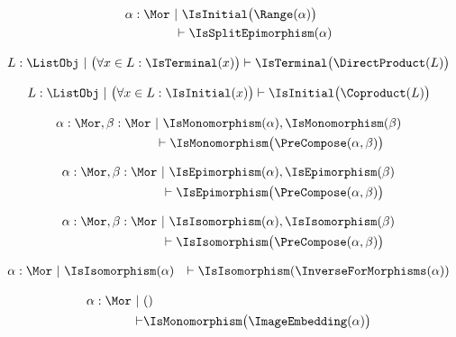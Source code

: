 \begin{sequent}\label{sequent:no_proper_context_8}
\begin{align*}
  \alpha:\Mor ~&|~ \IsInitial\big( \Range( \alpha ) \big)\\
  &\vdash \IsSplitEpimorphism( \alpha )
\end{align*}
\end{sequent}

\begin{sequent}
\begin{align*}
  L: \ListObj ~|~ \big(\forall x \in L: \IsTerminal(x)\big) \vdash \IsTerminal\big( \DirectProduct( L ) \big)
\end{align*}
\end{sequent}

\begin{sequent}
\begin{align*}
  L: \ListObj ~|~ \big(\forall x \in L: \IsInitial(x)\big) \vdash \IsInitial\big( \Coproduct( L ) \big)
\end{align*}
\end{sequent}

\begin{sequent}
\begin{align*}
 \alpha:\Mor, \beta:\Mor ~&|~ \IsMonomorphism( \alpha ), \IsMonomorphism( \beta )  \\
 &\vdash \IsMonomorphism\big( \PreCompose( \alpha, \beta ) \big)
\end{align*}
\end{sequent}

\begin{sequent}
\begin{align*}
 \alpha:\Mor, \beta:\Mor ~&|~ \IsEpimorphism( \alpha ), \IsEpimorphism( \beta )  \\
 &\vdash \IsEpimorphism\big( \PreCompose( \alpha, \beta ) \big)
\end{align*}
\end{sequent}

\begin{sequent}
\begin{align*}
 \alpha:\Mor, \beta:\Mor ~&|~ \IsIsomorphism( \alpha ), \IsIsomorphism( \beta )  \\
 &\vdash \IsIsomorphism\big( \PreCompose( \alpha, \beta ) \big)
\end{align*}
\end{sequent}

\begin{sequent}
\begin{align*}
 \alpha:\Mor ~&|~ \IsIsomorphism( \alpha ) &\vdash \IsIsomorphism( \InverseForMorphisms( \alpha ) )
\end{align*}
\end{sequent}

\begin{sequent}
\begin{align*}
  \alpha:\Mor~|~ & () \\
  \vdash &\IsMonomorphism\big( \ImageEmbedding( \alpha ) \big)
\end{align*}
\end{sequent}
